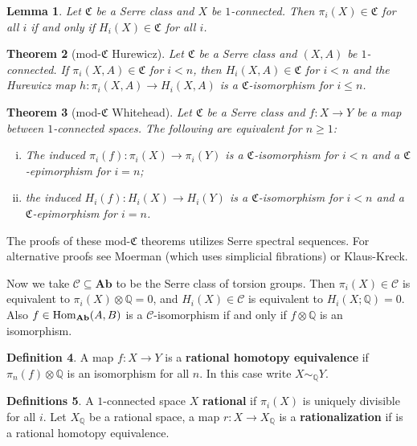 \documentclass[psamsfonts]{amsart}
\newtheorem{thm}{Theorem}[section]
\newtheorem{lem}[thm]{Lemma}
\theoremstyle{definition}
\newtheorem{defn}[thm]{Definition}
\newtheorem{defns}[thm]{Definitions}
\theoremstyle{remark}
\newcommand{\Q}{\mathbb{Q}}
\newcommand{\Ab}{\mathbf{Ab}}
\newcommand{\Hom}{\textup{Hom}}
\numberwithin{equation}{section}
\begin{document}
\begin{lem}
Let $\mathfrak{C}$ be a Serre class and $X$ be $1$-connected. Then $\pi_i(X)\in\mathfrak{C}$ for all $i$ if and only if $H_i(X)\in\mathfrak{C}$ for all $i$.
\end{lem}

\begin{thm}[mod-$\mathfrak{C}$ Hurewicz]
Let $\mathfrak{C}$ be a Serre class and $(X,A)$ be $1$-connected. If $\pi_i(X,A)\in\mathfrak{C}$ for $i<n$, then $H_i(X,A)\in\mathfrak{C}$ for $i<n$ and the Hurewicz map $h:\pi_i(X,A)\to H_i(X,A)$ is a $\mathfrak{C}$-isomorphism for $i\leq n$.
\end{thm}

\begin{thm}[mod-$\mathfrak{C}$ Whitehead]
Let $\mathfrak{C}$ be a Serre class and $f:X\to Y$ be a map between $1$-connected spaces. The following are equivalent for $n\geq1$:\begin{enumerate}[(i)]
    \item The induced $\pi_i(f):\pi_i(X)\to\pi_i(Y)$ is a $\mathfrak{C}$-isomorphism for $i<n$ and a $\mathfrak{C}$-epimorphism for $i=n$;
    \item the induced $H_i(f):H_i(X)\to H_i(Y)$ is a $\mathfrak{C}$-isomorphism for $i<n$ and a $\mathfrak{C}$-epimorphism for $i=n$.
\end{enumerate}
\end{thm}

The proofs of these mod-$\mathfrak{C}$ theorems utilizes Serre spectral sequences. For alternative proofs see Moerman\cite{Moerman} (which uses simplicial fibrations) or Klaus-Kreck\cite{Klaus-Kreck}.

Now we take $\mathcal{C}\subseteq\Ab$ to be the Serre class of torsion groups. Then $\pi_i(X)\in\mathcal{C}$ is equivalent to $\pi_i(X)\otimes\Q=0$, and $H_i(X)\in\mathcal{C}$ is equivalent to $H_i(X;\Q)=0$. Also $f\in\Hom_{\Ab}(A,B)$ is a $\mathcal{C}$-isomorphism if and only if $f\otimes\Q$ is an isomorphism.

\begin{defn}
A map $f:X\to Y$ is a \textbf{rational homotopy equivalence} if $\pi_n(f)\otimes\Q$ is an isomorphism for all $n$. In this case write $X\sim_\Q Y$.
\end{defn}

\begin{defns}
A $1$-connected space $X$ \textbf{rational} if $\pi_i(X)$ is uniquely divisible for all $i$. Let $X_\Q$ be a rational space, a map $r:X\to X_\Q$ is a \textbf{rationalization} if is a rational homotopy equivalence.
\end{defns}
\end{document}
